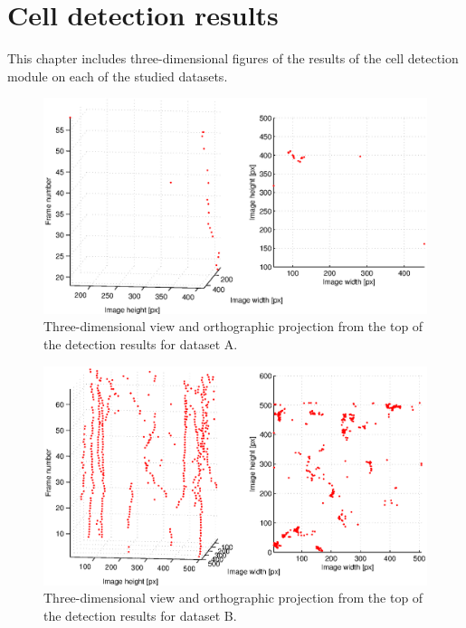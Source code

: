 \chapter{Cell detection results}
	\label{app:appendix_detectionresults}
	
	This chapter includes three-dimensional figures of the results of the cell detection module on each of the studied datasets.
	
	\begin{figure}[h]
		\includegraphics[width=\textwidth]{images/fig_results_detector_sequences_1}
		\caption{Three-dimensional view and orthographic projection from the top of the detection results for dataset A.}
		\label{fig:results_detector_sequences_1}
	\end{figure}
	
	\begin{figure}[h]
		\includegraphics[width=\textwidth]{images/fig_results_detector_sequences_2}
		\caption{Three-dimensional view and orthographic projection from the top of the detection results for dataset B.}
		\label{fig:results_detector_sequences_2}
	\end{figure}
	
